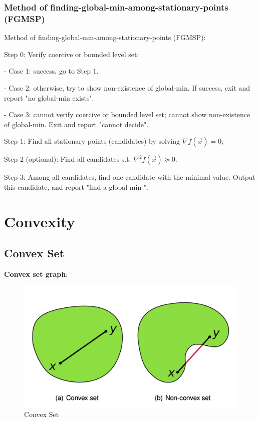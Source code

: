 \documentclass[11pt,a4paper]{article}
\begin{document}
\subsubsection{Method of finding-global-min-among-stationary-points (FGMSP)}
Method of finding-global-min-among-stationary-points (FGMSP):

Step 0: Verify coercive or bounded level set:

- Case 1: success, go to Step $1 .$

- Case 2: otherwise, try to show non-existence of global-min. If success, exit and report "no global-min exists".

- Case 3: cannot verify coercive or bounded level set; cannot show non-existence of global-min. Exit and report "cannot decide".

Step 1: Find all stationary points (candidates) by solving $\nabla f(\vec{x})=0$;

Step 2 (optional): Find all candidates s.t. $\nabla^{2} f(\vec{x}) \succeq 0$.

Step 3: Among all candidates, find one candidate with the minimal value. Output this candidate, and report "find a global $\mathrm{min}$ ".


\section{Convexity}
\subsection{Convex Set}
\begin{center}
\end{center}
\textbf{Convex set graph}:
\begin{center}\begin{figure}[htbp]
    \centering
    \includegraphics[scale=0.3]{Convex_set.png}
    \caption{Convex Set}
    \label{}
\end{figure}\end{center}
\end{document}
